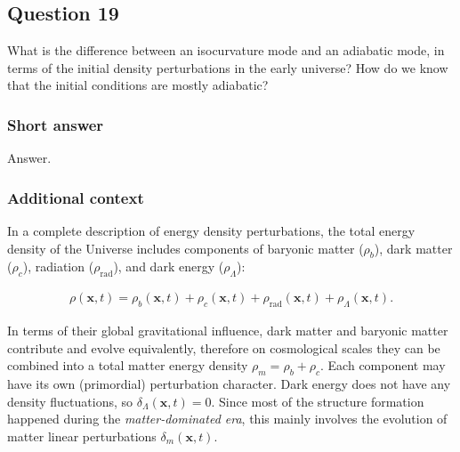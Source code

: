 \documentclass[a4paper,11pt]{article}
\begin{document}
\newpage
\subsection{Question 19}

What is the difference between an isocurvature mode and an adiabatic mode, in terms of the initial density perturbations in the early universe? How do we know that the initial conditions are mostly adiabatic?

\subsubsection{Short answer}

Answer.

\subsubsection{Additional context}

In a complete description of energy density perturbations, the total energy density of the Universe includes components of baryonic matter ($\rho_b$), dark matter ($\rho_c$), radiation ($\rho_\mathrm{rad}$), and dark energy ($\rho_\Lambda$):

\begin{align*}
    \rho(\mathbf{x},t) = \rho_b(\mathbf{x},t) + \rho_c(\mathbf{x},t) + \rho_\mathrm{rad}(\mathbf{x},t) + \rho_\Lambda(\mathbf{x},t).
\end{align*}

{\noindent}In terms of their global gravitational influence, dark matter and baryonic matter contribute and evolve equivalently, therefore on cosmological scales they can be combined into a total matter energy density $\rho_m = \rho_b + \rho_c$. Each component may have its own (primordial) perturbation character. Dark energy does not have any density fluctuations, so $\delta_\Lambda(\mathbf{x},t) = 0$. Since most of the structure formation happened during the \textit{matter-dominated era}, this mainly involves the evolution of matter linear perturbations $\delta_m(\mathbf{x},t)$.
\end{document}
